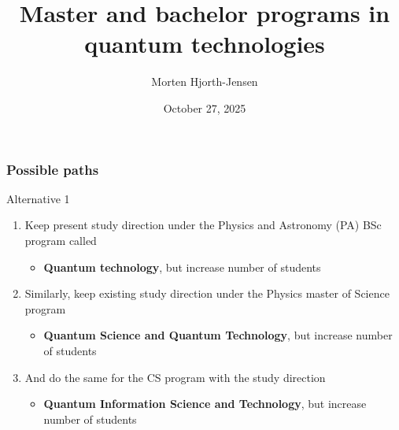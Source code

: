 \documentclass{beamer}
\begin{document}
\title{Master and bachelor programs in quantum technologies}
\author{Morten Hjorth-Jensen}
\date{October 27, 2025}


\begin{frame}
\titlepage
\end{frame}

\begin{frame}
\frametitle{Possible paths}

\begin{block}{Alternative 1 }

\begin{enumerate}
\item Keep present study direction under the Physics and Astronomy (PA) BSc program called
\begin{itemize}

  \item \textbf{Quantum technology}, but increase number of students

\end{itemize}

\noindent
\item Similarly, keep existing study direction under the Physics master of Science program
\begin{itemize}

  \item \textbf{Quantum Science and Quantum Technology}, but increase number of students

\end{itemize}

\noindent
\item And do the same for the CS program with the study direction
\begin{itemize}

  \item \textbf{Quantum Information Science and Technology}, but increase number of students
\end{itemize}

\noindent
\end{enumerate}

\noindent
\end{block}
\end{frame}
\end{document}
